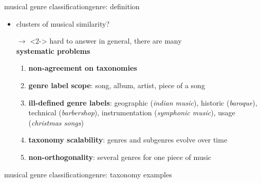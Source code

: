         \begin{frame}{musical genre classification}{genre: definition}

            \begin{itemize}
                \item   clusters of musical similarity?
                \item[$\rightarrow$]<2->             hard to answer in general, there are many\\ \textbf{systematic problems}
                    \begin{enumerate}
                        \item<4->	\textbf{non-agreement on taxonomies}
                        \item<5->   \textbf{genre label scope}: song, album, artist, piece of a song
                        \item<6->	\textbf{ill-defined genre labels}: geographic (\textit{indian music}), historic (\textit{baroque}), technical (\textit{barbershop}), instrumentation (\textit{symphonic music}), usage (\textit{christmas songs})
                        \item<7->	\textbf{taxonomy scalability}: genres and subgenres evolve over time
                        \item<8->	\textbf{non-orthogonality}: several genres for one piece of music
                    \end{enumerate}

            \end{itemize}
            
        \end{frame}
        \begin{frame}{musical genre classification}{genre: taxonomy examples}
                \vspace{-20mm}
                \begin{center}
                \scalebox{.6}
                {
                    
                }
                \end{center}
        \end{frame}

